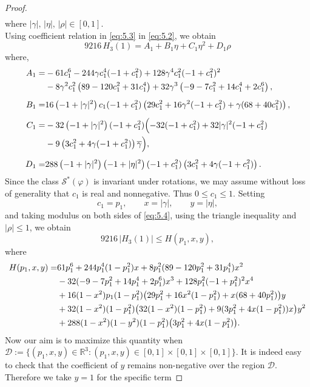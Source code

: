 \documentclass[a4paper,12pt,reqno]{amsart} %
\numberwithin{equation}{section}
\theoremstyle{definition}
\begin{document}
\begin{proof}
\begin{align}
\end{align}
where $|\gamma|,\,  |\eta|,\,  |\rho| \in [0, 1].$\\[2mm]
Using coefficient relation in \eqref{eq:5.3} in \eqref{eq:5.2}, we obtain
\begin{equation}\label{eq:5.4}
	9216 \, H_{3}(1)=A_{1}+B_{1} \eta +C_{1}\eta^2+D_{1}\rho
\end{equation}
where,
\begin{align*}
	A_1=&-61c_1^6-244\gamma c_1^4(-1+c_1^2)+128\gamma^4c_1^2(-1+c_1^2)^2 \\
	\quad &-8\gamma^2c_1^2\left(89-120c_1^2+31c_1^4\right)
	+32\gamma^3\left(-9-7c_1^2+14c_1^4+2c_1^6\right),\\[0.5em]
	B_1=&16\left(-1+|\gamma|^2\right)c_1(-1+c_1^2)
	\left(29c_1^2+16\gamma^2(-1+c_1^2)+\gamma(68+40c_1^2)\right),\\[0.5em]
	C_1=&-32\left(-1+|\gamma|^2\right)(-1+c_1^2)
	\Bigl(-32(-1+c_1^2)+32|\gamma|^2(-1+c_1^2) \\
	\quad &-9\left(3c_1^2+4\gamma(-1+c_1^2)\right)\overline{\gamma}\Bigr),\\[0.5em]
	D_1=&288\left(-1+|\gamma|^2\right)\left(-1+|\eta|^2\right)(-1+c_1^2)
	\left(3c_1^2+4\gamma(-1+c_1^2)\right).
\end{align*}
Since the class $\mathcal{S}^*(\varphi)$ is invariant under rotations, we may assume without loss of generality that $c_1$ is real and nonnegative. Thus
$
0\le c_1\le 1.
$
Setting
\[
c_1=p_1,\qquad x=|\gamma|,\qquad y=|\eta|,
\]
and taking modulus on both sides of \eqref{eq:5.4}, using the triangle inequality and $|\rho|\le 1$, we obtain
\[
9216\,|H_3(1)|\le H(p_1,x,y),
\]
where 
\begin{align}
	H(p_1,x,y)=&61p_1^6+244p_1^4(1-p_1^2)x
	+8p_1^2(89-120p_1^2+31p_1^4)x^2 \notag\\
	\quad
	&-32(-9-7p_1^2+14p_1^4+2p_1^6)x^3
	+128p_1^2(-1+p_1^2)^2x^4 \notag\\
	\quad
	&+16(1-x^2)p_1(1-p_1^2)\bigl(29p_1^2+16x^2(1-p_1^2)+x(68+40p_1^2)\bigr)y \notag\\
	\quad
	&+32(1-x^2)(1-p_1^2)\bigl(32(1-x^2)(1-p_1^2)+9(3p_1^2+4x(1-p_1^2))x\bigr)y^2 \notag\\
	\quad
	&+288(1-x^2)(1-y^2)(1-p_1^2)\bigl(3p_1^2+4x(1-p_1^2)\bigr).
\end{align}
Now our aim is to maximize this quantity when $\mathcal{D}:=\{(p_1, x, y)\in \mathbb{R}^3:(p_1,x,y)\in [0,1]\times[0, 1]\times[0, 1]\}.$
It is indeed easy to check that the coefficient of $y$ remains non-negative over the region $\mathcal{D}.$ Therefore we take $y=1$ for the specific term 

\end{proof}
\end{document}
